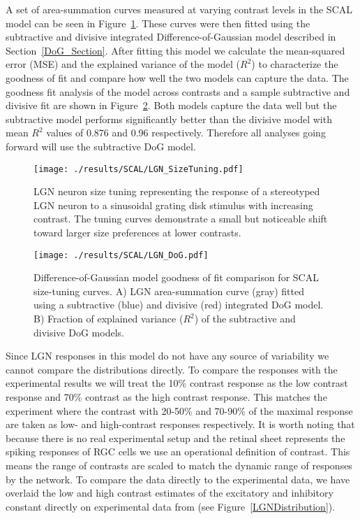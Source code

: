 A set of area-summation curves measured at varying contrast levels in
the SCAL model can be seen in Figure~\ref{LGNSizeTuning}. These curves
were then fitted using the subtractive and divisive integrated
Difference-of-Gaussian model described in Section~\ref{DoG_Section}.
After fitting this model we calculate the mean-squared error (MSE) and
the explained variance of the model ($R^2$) to characterize the
goodness of fit and compare how well the two models can capture the
data. The goodness fit analysis of the model across contrasts and a
sample subtractive and divisive fit are shown in
Figure~\ref{LGNSizeFit}. Both models capture the data well but the
subtractive model performs significantly better than the divisive
model with mean $R^2$ values of 0.876 and 0.96 respectively. Therefore
all analyses going forward will use the subtractive DoG model.

\begin{figure}
	\centering
    \texttt{[image: ./results/SCAL/LGN\_SizeTuning.pdf]}
	\caption[SCAL model size-tuning curves]{LGN neuron size tuning
      representing the response of a stereotyped LGN neuron to a
      sinusoidal grating disk stimulus with increasing contrast. The
      tuning curves demonstrate a small but noticeable shift toward
      larger size preferences at lower contrasts.}
	\label{LGNSizeTuning}
\end{figure}

\begin{figure}
	\centering
        \texttt{[image: ./results/SCAL/LGN\_DoG.pdf]}
	    \caption[SCAL model size-tuning DoG
          fit.]{Difference-of-Gaussian model goodness of fit
          comparison for SCAL size-tuning curves. A) LGN
          area-summation curve (gray) fitted using a subtractive
          (blue) and divisive (red) integrated DoG model. B) Fraction
          of explained variance ($R^2$) of the subtractive and
          divisive DoG models.}
	\label{LGNSizeFit}
\end{figure}

Since LGN responses in this model do not have any source of
variability we cannot compare the distributions directly. To compare
the responses with the experimental results we will treat the 10\%
contrast response as the low contrast response and 70\% contrast as
the high contrast response. This matches the experiment where the
contrast with 20-50\% and 70-90\% of the maximal response are taken as
low- and high-contrast responses respectively. It is worth noting that
because there is no real experimental setup and the retinal sheet
represents the spiking responses of RGC cells we use an operational
definition of contrast. This means the range of contrasts are scaled
to match the dynamic range of responses by the network. To compare the
data directly to the experimental data, we have overlaid the low and
high contrast estimates of the excitatory and inhibitory constant
directly on experimental data from \cite{Sceniak2006} (see
Figure~\ref{LGNDistribution}).

